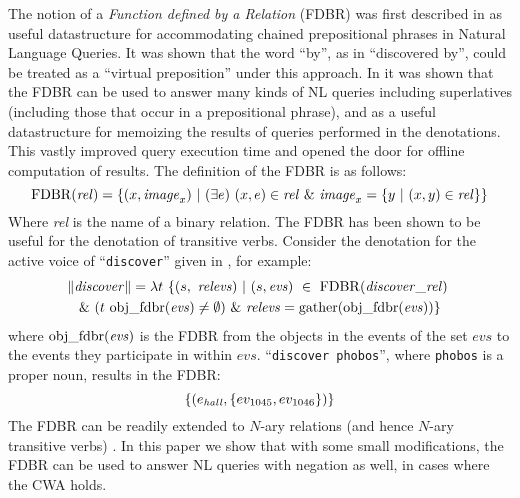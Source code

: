 \documentclass[../main.tex]{subfiles}
\begin{document}
\begin{refsection}
The notion of a \textit{Function defined by a Relation} (FDBR) was first described in \cite{peelar2016accommodating} as useful datastructure for accommodating chained prepositional phrases in Natural Language Queries.  It was shown that the word ``by'', as in ``discovered by'', could be treated as a ``virtual preposition'' under this approach. In \cite{frostpeelar2019} it was shown that the FDBR can be used to answer many kinds of NL queries including superlatives (including those that occur in a prepositional phrase), and as a useful datastructure for memoizing the results of queries performed in the denotations.  This vastly improved query execution time and opened the door for offline computation of results.
The definition of the FDBR is as follows:
\begin{equation*}
		\FDBR{\mathit{rel}} = \{(x, \mathit{image}_x)\ | \ (\exists e)\ (x, e) \in \mathit{rel}\ \& \ \mathit{image}_x = \{ y\ |\ (x, y) \in \mathit{rel} \}  \}
\end{equation*}
Where \textit{rel} is the name of a binary relation.
The FDBR has been shown to be useful for the denotation of transitive verbs.  Consider the denotation for the active voice of ``\texttt{discover}'' given in \cite{peelar2020compositional}, for example:
\begin{multline*}
	\meaningof{discover} =
	\lambda t\ \{ (s,\ \mathit{relevs})\ |\ (s, \mathit{evs})\ \in\ \FDBR{\relation{discover}}\ \\
	\&\ (t\ \objfdbr{evs} \neq \emptyset)\ \&\ \mathit{relevs} = \gatherevs{\objfdbr{evs}} \}
\end{multline*}
where $\mathrm{obj\_fdbr}(\mathit{evs})$ is the FDBR from the objects in the events of the set $\mathit{evs}$ to the events they participate in within $\mathit{evs}$.  ``\texttt{discover phobos}'', where \texttt{phobos} is a proper noun, results in the FDBR:
\begin{equation*}
	\{(e_{\mathit{hall}}, \{ ev_{\mathrm{1045}}, ev_{\mathrm{1046}} \})\}
\end{equation*}
The FDBR can be readily extended to $N$-ary relations (and hence $N$-ary transitive verbs) \cite{peelar2020compositional}. In this paper we show that with some small modifications, the FDBR can be used to answer NL queries with negation as well, in cases where the CWA holds.
%
%


\end{refsection}
\end{document}
